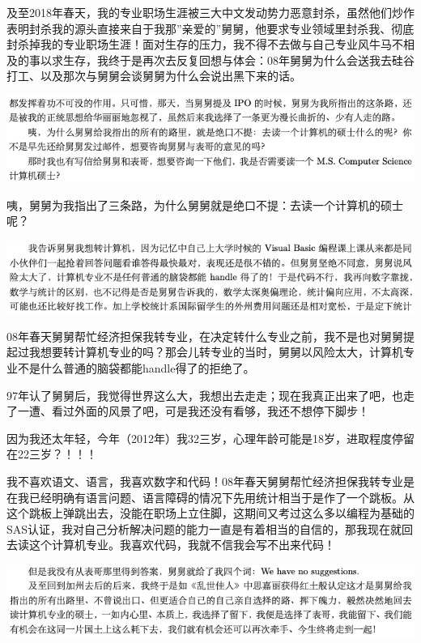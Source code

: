 \documentclass[9pt, b5paper]{article}
\begin{document}
及至2018年春天，我的专业职场生涯被三大中文发动势力恶意封杀，虽然他们炒作表明封杀我的源头直接来自于我那”亲爱的”舅舅，他要求专业领域里封杀我、彻底封杀掉我的专业职场生涯！面对生存的压力，我不得不去做与自己专业风牛马不相及的事以求生存，我终于是再次去反复回想与体会：08年舅舅为什么会送我去硅谷打工、以及那次与舅舅会谈舅舅为什么会说出黑下来的话。 

\begin{center}
\includegraphics[width=.9\linewidth]{./pic/backups_plans_20210416_100706.png}
\end{center}

咦，舅舅为我指出了三条路，为什么舅舅就是绝口不提：去读一个计算机的硕士呢？

\begin{center}
\includegraphics[width=.9\linewidth]{./pic/backups_plans_20210416_101207.png}
\end{center}

08年春天舅舅帮忙经济担保我转专业，在决定转什么专业之前，我不是也对舅舅提起过我想要转计算机专业的吗？那会儿转专业的当时，舅舅以风险太大，计算机专业不是什么普通的脑袋都能handle得了的拒绝了。

97年认了舅舅后，我觉得世界这么大，我想出去走走；现在我真正出来了吧，也走了一遭、看过外面的风景了吧，可是我还没有看够，我还不想停下脚步！

因为我还太年轻，今年（2012年）我32三岁，心理年龄可能是18岁，进取程度停留在22三岁？！！！

我不喜欢语文、语言，我喜欢数字和代码！08年春天舅舅帮忙经济担保我转专业是在我已经明确有语言问题、语言障碍的情况下先用统计相当于是作了一个跳板。从这个跳板上弹跳出去，没能在职场上立住脚，这期间又考过这么多以编程为基础的SAS认证，我对自己分析解决问题的能力一直是有着相当的自信的，那我现在就回去读这个计算机专业。我喜欢代码，我就不信我会写不出来代码！

\begin{center}
\includegraphics[width=.9\linewidth]{./pic/backups_plans_20210416_100815.png}
\end{center}
\end{document}
